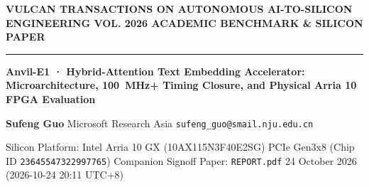 \documentclass[11pt,a4paper]{article}
\begin{document}
{\scriptsize\sffamily\textcolor{vulcan}{\textbf{VULCAN TRANSACTIONS ON AUTONOMOUS AI-TO-SILICON ENGINEERING \hfill VOL. 2026 \textperiodcentered{} ACADEMIC BENCHMARK \& SILICON PAPER}}\par}

\vspace{1pt}\textcolor{vulcan}{\rule{\textwidth}{1.2pt}}\vspace{3pt}

\begin{center}

{\sffamily\LARGE\bfseries Anvil-E1 · Hybrid-Attention Text Embedding Accelerator: Microarchitecture, 100~MHz+ Timing Closure, and Physical Arria 10 FPGA Evaluation\par}\vspace{3pt}

{\small\sffamily\textbf{Sufeng Guo} \textperiodcentered{} Microsoft Research Asia \textperiodcentered{} \texttt{sufeng\_guo@smail.nju.edu.cn}\par}\vspace{1pt}

{\scriptsize\sffamily\textcolor{black!75}{Silicon Platform: Intel Arria 10 GX (\allowbreak{}10AX115N3F40E2SG)\allowbreak{} PCIe Gen3x8 (Chip ID \texttt{23645547322997765}) \textperiodcentered{} Companion Signoff Paper: \texttt{REPORT.pdf} \textperiodcentered{} 24 October 2026 (\allowbreak{}2026-10-24 20:11 UTC+\allowbreak{}8)\allowbreak{}}\par}

\end{center}\vspace{2pt}
\end{document}
